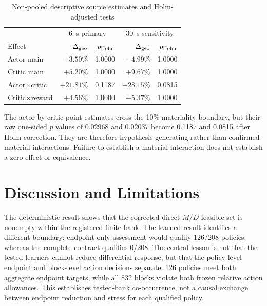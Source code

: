 \documentclass[conference,a4paper]{IEEEtran}
\begin{document}
\begin{table}[t]
\caption{Non-pooled descriptive source estimates and Holm-adjusted tests}
\label{tab:source_effects}
\centering
\scriptsize
\setlength{\tabcolsep}{2.6pt}
\begin{tabular}{@{}lrrrr@{}}
\toprule
& \multicolumn{2}{c}{\SI{6}{s} primary}
& \multicolumn{2}{c}{\SI{30}{s} sensitivity}\\
Effect & $\Delta_{\rm geo}$ & $p_{\rm Holm}$
       & $\Delta_{\rm geo}$ & $p_{\rm Holm}$\\
\midrule
Actor main           & $-3.50\%$  & 1.0000 & $-4.99\%$  & 1.0000\\
Critic main          & $+5.20\%$  & 1.0000 & $+9.67\%$  & 1.0000\\
Actor$\times$critic  & $+21.81\%$ & 0.1187 & $+28.15\%$ & 0.0815\\
Critic$\times$reward & $+4.56\%$  & 1.0000 & $-5.37\%$  & 1.0000\\
\bottomrule
\end{tabular}
\end{table}

The actor-by-critic point estimates cross the 10\% materiality boundary, but
their raw one-sided $p$ values of 0.02968 and 0.02037 become 0.1187 and 0.0815
after Holm correction. They are therefore hypothesis-generating rather than
confirmed material interactions. Failure to establish a material interaction
does not establish a zero effect or equivalence.

\section{Discussion and Limitations}
\label{sec:discussion}

The deterministic result shows that the corrected direct-$M/D$ feasible set is
nonempty within the registered finite bank. The learned result identifies a
different boundary: endpoint-only assessment would qualify 126/208 policies,
whereas the complete contract qualifies 0/208. The central
lesson is not that the tested learners cannot reduce differential response,
but that the policy-level endpoint and block-level action decisions separate:
126 policies meet both aggregate endpoint targets, while all 832 blocks violate
both frozen relative action allowances. This establishes tested-bank
co-occurrence, not a causal exchange between endpoint reduction and stress for
each qualified policy.
\end{document}
